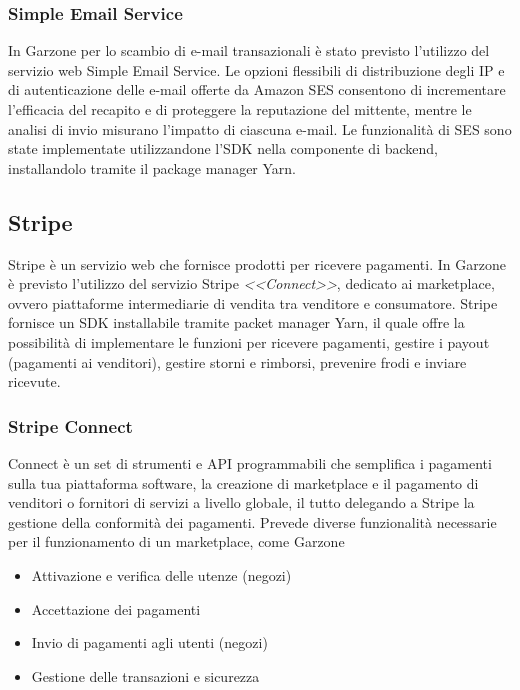 \subsubsection{Simple Email Service} 
In Garzone per lo scambio di e-mail transazionali è stato previsto l'utilizzo del servizio web Simple Email Service. Le opzioni flessibili di distribuzione degli IP e di autenticazione delle e-mail offerte da Amazon SES consentono di incrementare l'efficacia del recapito e di proteggere la reputazione del mittente, mentre le analisi di invio misurano l'impatto di ciascuna e-mail\cite{SES}. Le funzionalità di SES sono state implementate utilizzandone l'SDK nella componente di backend, installandolo tramite il package manager Yarn.
\subsection{Stripe}
Stripe è un servizio web che fornisce prodotti per ricevere pagamenti. In Garzone è previsto l'utilizzo del servizio Stripe \textit{<<Connect>>}, dedicato ai marketplace, ovvero piattaforme intermediarie di vendita tra venditore e consumatore. Stripe fornisce un SDK installabile tramite packet manager Yarn, il quale offre la possibilità di implementare le funzioni per ricevere pagamenti, gestire i payout (pagamenti ai venditori), gestire storni e rimborsi, prevenire frodi e inviare ricevute.
\subsubsection{Stripe Connect}
Connect è un set di strumenti e API programmabili che semplifica i pagamenti sulla tua piattaforma software, la creazione di marketplace e il pagamento di venditori o fornitori di servizi a livello globale, il tutto delegando a Stripe la gestione della conformità dei pagamenti\cite{STRIPE}. Prevede diverse funzionalità necessarie per il funzionamento di un marketplace, come Garzone
\begin{itemize}
  \item Attivazione e verifica delle utenze (negozi)
  \item Accettazione dei pagamenti
  \item Invio di pagamenti agli utenti (negozi)
  \item Gestione delle transazioni e sicurezza
\end{itemize}